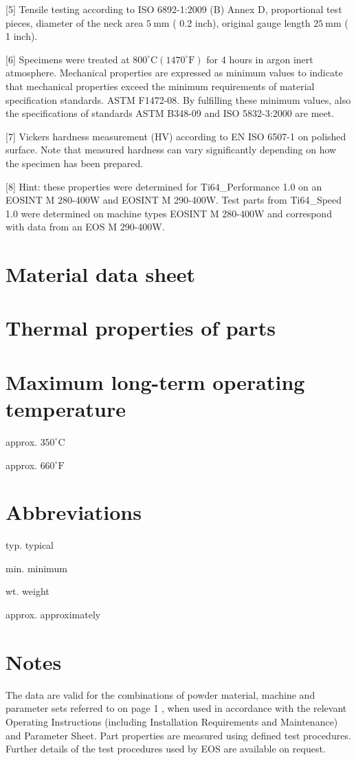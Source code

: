 \documentclass[10pt]{article}
\begin{document}
[5] Tensile testing according to ISO 6892-1:2009 (B) Annex D, proportional test pieces, diameter of the neck area $5 \mathrm{~mm}$ ( 0.2 inch), original gauge length $25 \mathrm{~mm}$ ( 1 inch).

[6] Specimens were treated at $800^{\circ} \mathrm{C}\left(1470^{\circ} \mathrm{F}\right)$ for 4 hours in argon inert atmosphere. Mechanical properties are expressed as minimum values to indicate that mechanical properties exceed the minimum requirements of material specification standards. ASTM F1472-08. By fulfilling these minimum values, also the specifications of standards ASTM B348-09 and ISO 5832-3:2000 are meet.

[7] Vickers hardness measurement (HV) according to EN ISO 6507-1 on polished surface. Note that measured hardness can vary significantly depending on how the specimen has been prepared.

[8] Hint: these properties were determined for Ti64\_Performance 1.0 on an EOSINT M 280-400W and EOSINT M 290-400W. Test parts from Ti64\_Speed 1.0 were determined on machine types EOSINT M 280-400W and correspond with data from an EOS M 290-400W.

\section*{Material data sheet}
\section*{Thermal properties of parts}
\section*{Maximum long-term operating temperature}
approx. $350^{\circ} \mathrm{C}$

approx. $660^{\circ} \mathrm{F}$

\section*{Abbreviations}
typ. typical

min. minimum

wt. weight

approx. approximately

\section*{Notes}
The data are valid for the combinations of powder material, machine and parameter sets referred to on page 1 , when used in accordance with the relevant Operating Instructions (including Installation Requirements and Maintenance) and Parameter Sheet. Part properties are measured using defined test procedures. Further details of the test procedures used by EOS are available on request.
\end{document}
